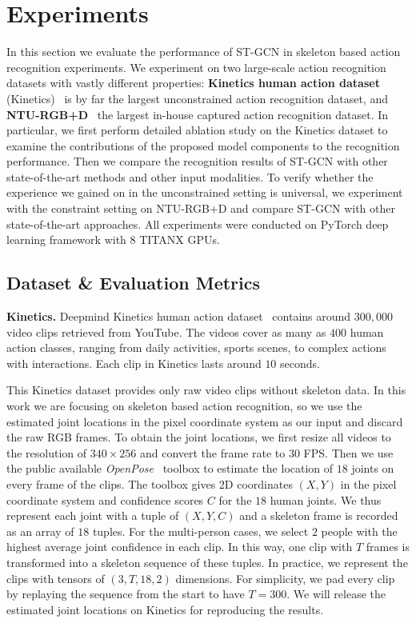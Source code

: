 \documentclass[letterpaper]{article} \usepackage{aaai18}  \usepackage{times}  \usepackage{helvet}  \usepackage{courier}  \usepackage{url}  \usepackage{graphicx}
\begin{document}
\section{Experiments}

In this section we evaluate the performance of ST-GCN in skeleton based action recognition experiments.
We experiment on two large-scale action recognition datasets with vastly different properties: \textbf{Kinetics human action dataset} (Kinetics)~\cite{Kay2017Kinetics} is by far the largest unconstrained action recognition dataset, and \textbf{NTU-RGB+D}~\cite{Shahroudy2016CVPR} the largest in-house captured action recognition dataset.
In particular, we first perform detailed ablation study on the Kinetics dataset to examine the contributions of the proposed model components to the recognition performance.
Then we compare the recognition results of ST-GCN with other state-of-the-art methods and other input modalities.
To verify whether the experience we gained on in the unconstrained setting is universal, we experiment with the constraint setting on NTU-RGB+D and compare ST-GCN with other state-of-the-art approaches.
All experiments were conducted on PyTorch deep learning framework with 8 TITANX GPUs.



\subsection{Dataset \& Evaluation Metrics}
\textbf{Kinetics.}
Deepmind Kinetics human action dataset~\cite{Kay2017Kinetics} contains around $300,000$ video clips retrieved from YouTube.
The videos cover as many as $400$ human action classes, ranging from daily activities, sports scenes, to complex actions with interactions.
Each clip in Kinetics lasts around $10$ seconds.

This Kinetics dataset provides only raw video clips without skeleton data. 
In this work we are focusing on skeleton based action recognition, so we use the estimated joint locations in the pixel coordinate system as our input and discard the raw RGB frames.
To obtain the joint locations, we first resize all videos to the resolution of $340 \times 256$ and convert the frame rate to $30$ FPS. Then we use the public available \emph{OpenPose}~\cite{Cao2017Openpose} toolbox to estimate the location of $ 18 $ joints on every frame of the clips.
The toolbox gives 2D coordinates $(X, Y)$ in the pixel coordinate system and confidence scores $C$ for the $18$ human joints.
We thus represent each joint with a tuple of $(X, Y, C)$ and a skeleton frame is recorded as an array of $ 18 $ tuples.
For the multi-person cases, we select $2$ people with the highest average joint confidence in each clip.
In this way, one clip with $ T $ frames is transformed into a skeleton sequence of these tuples.
In practice, we represent the clips with tensors of $ (3, T, 18, 2) $ dimensions.
For simplicity, we pad every clip by replaying the sequence from the start to have $ T=300 $.
We will release the estimated joint locations on Kinetics for reproducing the results.
\end{document}
